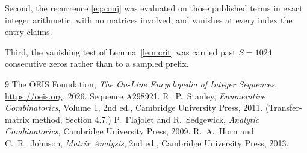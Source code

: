 \documentclass[11pt,a4paper]{article}
\theoremstyle{plain}
\theoremstyle{definition}
\begin{document}
Second, the recurrence \eqref{eq:conj} was evaluated on those published terms in exact
integer arithmetic, with no matrices involved, and vanishes at every index the entry claims.

Third, the vanishing test of Lemma~\ref{lem:crit} was carried past $S=1024$ consecutive
zeros rather than to a sampled prefix.

\begin{thebibliography}{9}
 The OEIS Foundation, \emph{The On-Line Encyclopedia of Integer
Sequences}, \url{https://oeis.org}, 2026. Sequence A298921.
 R.~P.~Stanley, \emph{Enumerative Combinatorics}, Volume 1, 2nd ed.,
Cambridge University Press, 2011. (Transfer-matrix method, Section 4.7.)
 P.~Flajolet and R.~Sedgewick, \emph{Analytic Combinatorics}, Cambridge
University Press, 2009.
 R.~A.~Horn and C.~R.~Johnson, \emph{Matrix Analysis}, 2nd ed., Cambridge
University Press, 2013.
\end{thebibliography}
\end{document}
